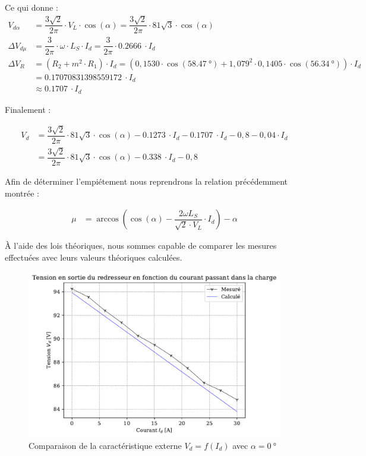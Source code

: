 \documentclass[a4paper, 11pt, openany, oneside, french]{article}
\begin{document}
Ce qui donne :
\begin{align*}
    V_{d\alpha} &= \dfrac{3\sqrt{2}}{2\pi} \cdot V_L \cdot \cos{\left(\alpha \right)} = \dfrac{3\sqrt{2}}{2\pi} \cdot 81 \sqrt{3} \cdot \cos{\left(\alpha \right)}\\
    \Delta V_{d\mu} &= \dfrac{3}{2\pi} \cdot \omega \cdot L_S \cdot I_d = \dfrac{3}{2\pi} \cdot \SI{0,2666}{} \cdot I_d\\
    \Delta V_R &= \left(R_2 + m^2 \cdot R_1 \right)\cdot I_d = \left(0,1530 \cdot \cos{\left(\SI{58.47}{\degree} \right)} + 1,079^2 \cdot 0,1405 \cdot \cos{\left(\SI{56.34}{\degree} \right)} \right)\cdot I_d\\
    &= \SI{0.17070831398559172}{}\cdot I_d\\
    &\approx \SI{0.1707}{}\cdot I_d
\end{align*}

Finalement :

\begin{align*}
    V_d &= \dfrac{3\sqrt{2}}{2\pi} \cdot 81 \sqrt{3} \cdot \cos{\left(\alpha \right)} - \SI{0.1273}{} \cdot I_d - \SI{0.1707}{}\cdot I_d - 0,8 - 0,04 \cdot I_d\\
    &= \dfrac{3\sqrt{2}}{2\pi} \cdot 81 \sqrt{3} \cdot \cos{\left(\alpha \right)} - \SI{0,338}{} \cdot I_d - 0,8
\end{align*}

Afin de déterminer l'empiétement nous reprendrons la relation précédemment montrée :

\begin{align*}
    \mu &= \arccos{\left(\cos{\left(\alpha \right)} - \dfrac{2 \omega L_S}{\sqrt{2} \cdot V_L}\cdot I_d\right)} - \alpha
\end{align*}

À l'aide des lois théoriques, nous sommes capable de comparer les mesures effectuées avec leurs valeurs théoriques calculées.

\begin{figure}[!ht]
    \centering
    \includegraphics[width=0.8\linewidth]{exp1_graph6}
    \caption{Comparaison de la caractéristique externe $V_d=f\left(I_d\right)$ avec $\alpha = \SI{0}{\degree}$}
    \label{fig:exp1grap6}
\end{figure}
\end{document}
